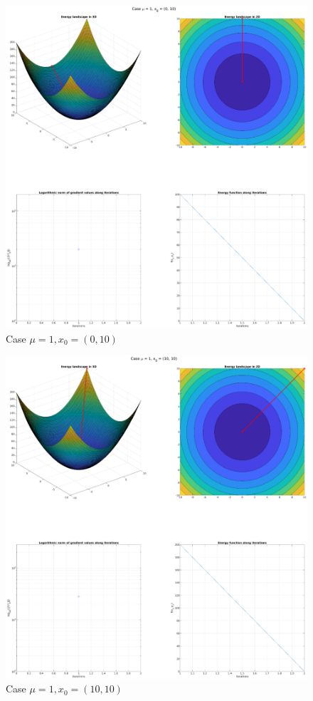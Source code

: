 \documentclass[unicode,11pt,a4paper,oneside,numbers=endperiod,openany]{scrartcl}
\begin{document}
\begin{figure}[H]
    \centering
    \caption{Case $\mu = 1, x_0 = (0, 10)$}
    \label{fig:ex3-5-mu1-x0010}
    \includegraphics[width=\textwidth, trim={5cm 3cm 5cm 1cm}, clip]{./figures/ex3-5-mu1-x0010.eps}
\end{figure}

\begin{figure}[H]
    \centering
    \caption{Case $\mu = 1, x_0 = (10, 10)$}
    \label{fig:ex3-5-mu1-x1010}
    \includegraphics[width=\textwidth, trim={5cm 3cm 5cm 1cm}, clip]{./figures/ex3-5-mu1-x1010.eps}
\end{figure}
\end{document}
